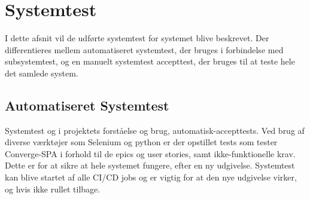 \section{Systemtest}

I dette afsnit vil de udførte systemtest for systemet blive beskrevet. Der differentieres mellem automatiseret systemtest, der bruges i forbindelse med subsystemtest, og en manuelt systemtest accepttest, der bruges til at teste hele det samlede system.

\subsection{Automatiseret Systemtest}

Systemtest og i projektets forståelse og brug, automatisk-accepttests. Ved brug af diverse værktøjer som Selenium og python er der opstillet tests som tester Converge-SPA i forhold til de epics og user stories, samt ikke-funktionelle krav. Dette er for at sikre at hele systemet fungere, efter en ny udgivelse. Systemtest kan blive startet af alle CI/CD jobs og er vigtig for at den nye udgivelse virker, og hvis ikke rullet tilbage.

